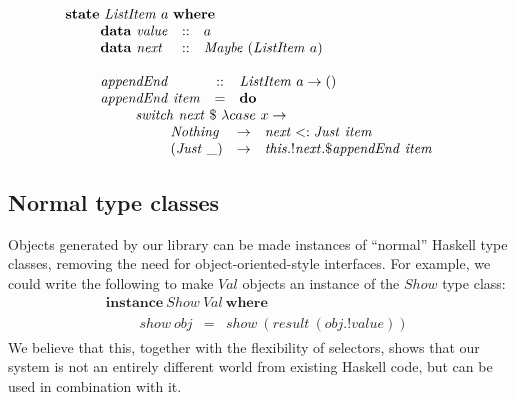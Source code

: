 \begin{displaymath}
\begin{array}{l}
\mathbf{state}~\mathit{ListItem}~a~\mathbf{where} \\
\qquad \begin{array}{lcl}
\mathbf{data}~\mathit{value} & :: & a \\
\mathbf{data}~\mathit{next}  & :: & \mathit{Maybe}~(\mathit{ListItem}~a)
\end{array}\\\\
\qquad \begin{array}{lcl}
\mathit{appendEnd} & :: & \mathit{ListItem}~a \to () \\
\mathit{appendEnd}~\mathit{item} & = & \mathbf{do} \\
 \multicolumn{3}{l}{\qquad \begin{array}{l}
\mathit{switch}~\mathit{next}~\$~\lambda case~x \to \\
\qquad \begin{array}{lcl}
\mathit{Nothing} & \to & \mathit{next} <: \mathit{Just}~\mathit{item} \\
\mathit{(Just~\_)} & \to & \mathit{this}.!\mathit{next}.\$\mathit{appendEnd}~\mathit{item}
\end{array}
\end{array}}
\end{array}
\end{array}
\end{displaymath}

\subsection{Normal type classes}

Objects generated by our library can be made instances of ``normal'' Haskell type classes, removing the need for object-oriented-style interfaces. For example, we could write the following to make $\mathit{Val}$ objects an instance of the $\mathit{Show}$ type class:
\begin{displaymath}
\begin{array}{l}
\mathbf{instance}~\mathit{Show}~\mathit{Val}~\mathbf{where}\\
\qquad \begin{array}{lcl}
\mathit{show}~\mathit{obj} & = & \mathit{show}~(\mathit{result}~(\mathit{obj}.!\mathit{value})) 
\end{array}
\end{array}
\end{displaymath}
We believe that this, together with the flexibility of selectors, shows that our system is not an entirely different world from existing Haskell code, but can be used in combination with it.